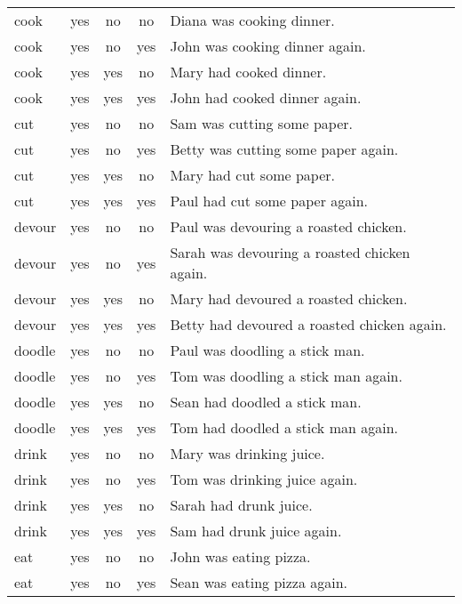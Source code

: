 \begin{longtable}{l|ccc|p{5cm}}
cook      & yes  & no   & no   & Diana was cooking dinner.                    \\
cook      & yes  & no   & yes  & John was cooking dinner again.               \\
cook      & yes  & yes  & no   & Mary had cooked dinner.                      \\
cook      & yes  & yes  & yes  & John had cooked dinner again.                \\
cut       & yes  & no   & no   & Sam was cutting some paper.                  \\
cut       & yes  & no   & yes  & Betty was cutting some paper again.          \\
cut       & yes  & yes  & no   & Mary had cut some paper.                     \\
cut       & yes  & yes  & yes  & Paul had cut some paper again.               \\
devour    & yes  & no   & no   & Paul was devouring a roasted chicken.        \\
devour    & yes  & no   & yes  & Sarah was devouring a roasted chicken again. \\
devour    & yes  & yes  & no   & Mary had devoured a roasted chicken.         \\
devour    & yes  & yes  & yes  & Betty had devoured a roasted chicken again.  \\
doodle    & yes  & no   & no   & Paul was doodling a stick man.               \\
doodle    & yes  & no   & yes  & Tom was doodling a stick man again.          \\
doodle    & yes  & yes  & no   & Sean had doodled a stick man.                \\
doodle    & yes  & yes  & yes  & Tom had doodled a stick man again.           \\
drink     & yes  & no   & no   & Mary was drinking juice.                     \\
drink     & yes  & no   & yes  & Tom was drinking juice again.                \\
drink     & yes  & yes  & no   & Sarah had drunk juice.                       \\
drink     & yes  & yes  & yes  & Sam had drunk juice again.                   \\
eat       & yes  & no   & no   & John was eating pizza.                       \\
eat       & yes  & no   & yes  & Sean was eating pizza again.                 \\

\end{longtable}
